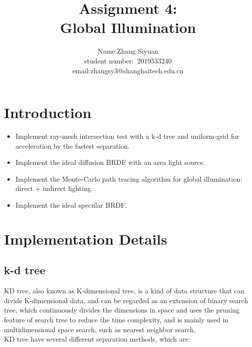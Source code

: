 \documentclass[acmtog]{acmart}
\title{Assignment 4:\\ {Global Illumination}}
\author{Name:\quad Zhang Siyuan  \\ student number:\ 2019533240
\\email:\quad zhangsy3@shanghaitech.edu.cn}
\begin{document}
	\maketitle

	\vspace*{2 ex}

	\section{Introduction}
	\begin{itemize}
		\item Implement ray-mesh intersection test with a k-d tree and uniform-grid for acceleration by the fastest separation.
		\item Implement the ideal diffusion BRDF with an area light source.
		\item Implement the Monte-Carlo path tracing algorithm for global illumination: direct + indirect lighting.
		\item Implement the ideal specular BRDF.
	\end{itemize}
	\section{Implementation Details}
	\subsection{k-d tree}
	KD tree, also known as K-dimensional tree, is a kind of data structure that can divide K-dimensional data, and can be regarded as an extension of binary search tree, which continuously divides the dimensions in space and uses the pruning feature of search tree to reduce the time complexity, and is mainly used in multidimensional space search, such as nearest neighbor search.
	\\
	KD tree have several different separation methods, which are:
\end{document}
